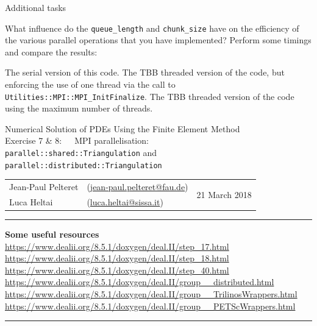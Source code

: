 \documentclass[11pt]{exam}
\makeatletter
\newcommand{\makeheader}[3]{%
\setcounter{question}{0}
\begin{center}
{\sc Numerical Solution of PDEs Using the Finite Element Method}\vspace{2ex}\\
{\sc Exercise #1:\ \ \ #2}\vspace{2ex}\\
\begin{tabular*}{\textwidth}{ll @{\extracolsep{\fill}}r}
Jean-Paul Pelteret & (\url{jean-paul.pelteret@fau.de}) & \multirow{2}{*}{#3} \\
Luca Heltai & (\url{luca.heltai@sissa.it}) & \\
\end{tabular*}
\end{center}
}
\newcommand{\makeresources}[1]{%
\rule{\textwidth}{0.6mm}
\textbf{Some useful resources}\\[1.5ex]
#1 \par
\rule{\textwidth}{0.6mm}
}
\makeatother
\begin{document}
\begin{questions}
\question Additional tasks
\begin{parts}
\bonuspart What influence do the \verb|queue_length| and \verb|chunk_size| have on the efficiency of the various parallel operations that you have implemented?
\bonuspart Perform some timings and compare the results:
\begin{subparts}
\subpart The serial version of this code.
\subpart The TBB threaded version of the code, but enforcing the use of one thread via the call to \verb|Utilities::MPI::MPI_InitFinalize|.
\subpart The TBB threaded version of the code using the maximum number of threads.
\end{subparts}
\end{parts}

\end{questions}




\clearpage
\makeheader{7 \& 8}{MPI parallelisation: \\\texttt{parallel::shared::Triangulation} and \texttt{parallel::distributed::Triangulation}}{21 March 2018}
\makeresources{%
\url{https://www.dealii.org/8.5.1/doxygen/deal.II/step_17.html} \\
\url{https://www.dealii.org/8.5.1/doxygen/deal.II/step_18.html} \\
\url{https://www.dealii.org/8.5.1/doxygen/deal.II/step_40.html} \\
\url{https://www.dealii.org/8.5.1/doxygen/deal.II/group__distributed.html} \\
\url{https://www.dealii.org/8.5.1/doxygen/deal.II/group__TrilinosWrappers.html} \\
\url{https://www.dealii.org/8.5.1/doxygen/deal.II/group__PETScWrappers.html}
}

\end{document}
